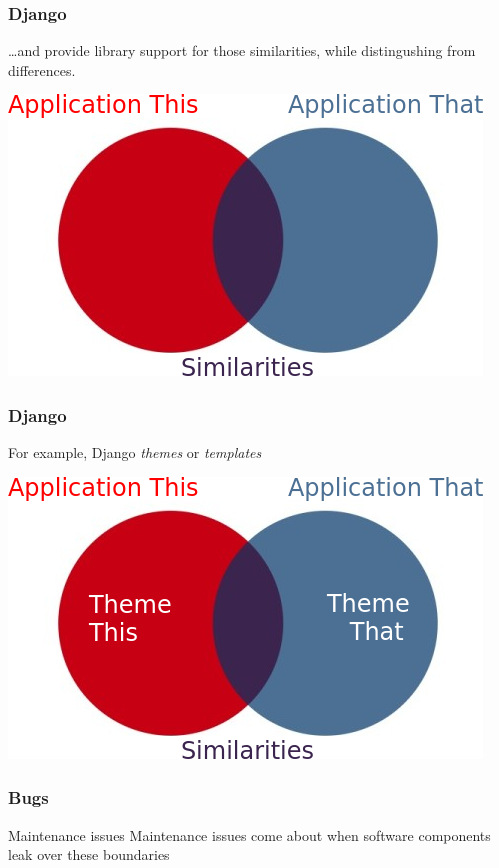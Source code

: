 \begin{frame}
\frametitle{Django}
\begin{center}
\ldots and provide library support for those similarities, while distingushing from differences.
\end{center}
\vspace{3em}
\begin{center}
\includegraphics[width=0.4\paperwidth]{image/venn-joined.png}
\end{center}
\end{frame}


\begin{frame}
\frametitle{Django}
\begin{center}
For example, Django \emph{themes} or \emph{templates}
\end{center}
\vspace{3em}
\begin{center}
\includegraphics[width=0.4\paperwidth]{image/venn-themes.png}
\end{center}
\end{frame}


\begin{frame}
\frametitle{Bugs}
\begin{block}{Maintenance issues}
Maintenance issues come about when software components leak over these boundaries
\end{block}
\end{frame}


